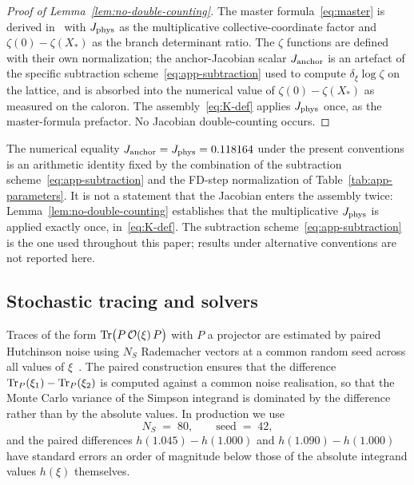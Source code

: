 \documentclass[a4paper,11pt]{article}
\theoremstyle{definition}
\newcommand{\Tr}{\mathop{\rm Tr}}
\newcommand{\Jphys}{J_{\rm phys}}
\begin{document}
\begin{proof}[Proof of Lemma~\ref{lem:no-double-counting}]
The master formula~\eqref{eq:master} is derived in~\cite{companion-structural} with $\Jphys$ as the multiplicative collective-coordinate factor and $\zeta(0) - \zeta(X_*)$ as the branch determinant ratio. The $\zeta$ functions are defined with their own normalization; the anchor-Jacobian scalar $J_{\rm anchor}$ is an artefact of the specific subtraction scheme~\eqref{eq:app-subtraction} used to compute $\delta_\xi\log\zeta$ on the lattice, and is absorbed into the numerical value of $\zeta(0) - \zeta(X_*)$ as measured on the caloron. The assembly~\eqref{eq:K-def} applies $\Jphys$ once, as the master-formula prefactor. No Jacobian double-counting occurs.
\end{proof}

The numerical equality $J_{\rm anchor} = \Jphys = 0.118164$ under the present conventions is an arithmetic identity fixed by the combination of the subtraction scheme~\eqref{eq:app-subtraction} and the FD-step normalization of Table~\ref{tab:app-parameters}. It is not a statement that the Jacobian enters the assembly twice: Lemma~\ref{lem:no-double-counting} establishes that the multiplicative $\Jphys$ is applied exactly once, in~\eqref{eq:K-def}. The subtraction scheme~\eqref{eq:app-subtraction} is the one used throughout this paper; results under alternative conventions are not reported here.

\subsection{Stochastic tracing and solvers}
\label{app:conv-stochastic}

Traces of the form $\Tr\bigl(P\,\mathcal{O}(\xi)\,P\bigr)$ with $P$ a
projector are estimated by paired Hutchinson noise using $N_S$ Rademacher
vectors at a common random seed across all values of
$\xi$~\cite{Hutchinson1990}. 
The paired construction ensures that the difference
$\Tr_P(\xi_1) - \Tr_P(\xi_2)$ is computed against a common noise
realisation, so that the Monte Carlo variance of the Simpson integrand is
dominated by the difference rather than by the absolute values. In
production we use
\begin{equation}
N_S \;=\; 80,\qquad \text{seed}\;=\;42,
\label{eq:app-seed}
\end{equation}
and the paired differences $h(1.045) - h(1.000)$ and $h(1.090) - h(1.000)$
have standard errors an order of magnitude below those of the absolute
integrand values $h(\xi)$ themselves.
\end{document}
